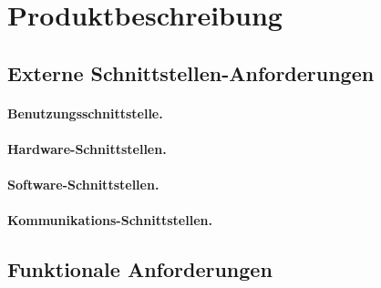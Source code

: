\section{Produktbeschreibung}


\subsection{Externe Schnittstellen-Anforderungen}

\paragraph{Benutzungsschnittstelle.}

\paragraph{Hardware-Schnittstellen.}

\paragraph{Software-Schnittstellen.}

\paragraph{Kommunikations-Schnittstellen.}

\subsection{Funktionale Anforderungen}

